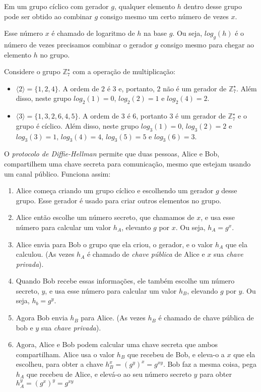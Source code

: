 Em um grupo cíclico com gerador $g$, qualquer elemento $h$ dentro desse grupo pode ser obtido ao combinar $g$ consigo mesmo um certo número de vezes $x$.

Esse número $x$ é chamado de logaritmo de $h$ na base $g$.
Ou seja, $log_g(h)$ é o número de vezes precisamos combinar o gerador $g$ consigo mesmo para chegar ao elemento $h$ no grupo.

\begin{example}
Considere o grupo $\mathbb{Z}_7^\star$ com a operação de multiplicação:
\begin{itemize}
\item $\langle 2 \rangle = \{1, 2, 4\}$.
  A ordem de $2$ é $3$ e, portanto, $2$ não é um gerador de $\mathbb{Z}_7^\star$.
  Além disso, neste grupo $log_2(1) = 0$, $log_2(2) = 1$ e $log_2(4) = 2$.
\item $\langle 3 \rangle = \{1, 3, 2, 6, 4, 5\}$.
  A ordem de $3$ é $6$, portanto $3$ é um gerador de $\mathbb{Z}_7^\star$ e o grupo é cíclico.
Além disso, neste grupo $log_3(1) = 0$, $log_3(2) = 2$ e $log_3(3) = 1$, $log_3(4)= 4$, $log_3(5) = 5$ e $log_3(6) = 3$.
\end{itemize}
\end{example}

O {\em protocolo de Diffie-Hellman} permite que duas pessoas, Alice e Bob, compartilhem uma chave secreta para comunicação, mesmo que estejam usando um canal público.
Funciona assim:
\begin{enumerate}
\item  Alice começa criando um grupo cíclico e escolhendo um gerador $g$ desse grupo.
  Esse gerador é usado para criar outros elementos no grupo.
\item Alice então escolhe um número secreto, que chamamos de $x$, e usa esse número para calcular um valor $h_A$, elevanto $g$ por $x$.
  Ou seja, $h_A = g^x$.
\item Alice envia para Bob o grupo que ela criou, o gerador, e o valor $h_A$ que ela calculou.
(As vezes $h_A$ é chamado de {\em chave pública} de Alice e $x$ sua {\em chave privada}).
\item Quando Bob recebe essas informações, ele também escolhe um número secreto, $y$, e usa esse número para calcular um valor $h_B$, elevando $g$ por $y$.
  Ou seja, $h_b = g^y$.
\item Agora Bob envia $h_B$ para Alice.
  (As vezes $h_B$ é chamado de chave pública de bob e $y$ sua {\em chave privada}).
\item Agora, Alice e Bob podem calcular uma chave secreta que ambos compartilham.
  Alice usa o valor $h_B$ que recebeu de Bob, e eleva-o a $x$ que ela escolheu, para obter a chave $h_B^x = (g^y)^x = g^{xy}$.
  Bob faz a mesma coisa, pega $h_A$ que recebeu de Alice, e elevá-o ao seu número secreto $y$ para obter $h_A^y = (g^x)^y = g^{xy}$
\end{enumerate}

